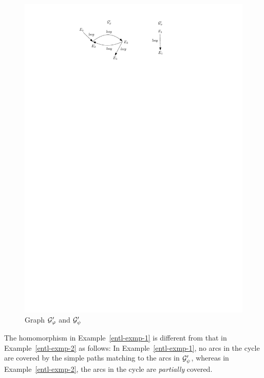 \documentclass{llncs}
\begin{document}
\begin{figure}[htbp]
\begin{center}
\includegraphics[scale=0.6]{entl-example-2.pdf}
\end{center}
\caption{Graph $\mathcal{G}'_\varphi$ and $\mathcal{G}'_\psi$}\label{fig-entl-example-2}
\end{figure}

The homomorphism in Example~\ref{entl-exmp-1} is different from that in Example~\ref{entl-exmp-2} as follows: In Example~\ref{entl-exmp-1}, no arcs in the cycle are covered by the simple paths matching to the arcs in $\mathcal{G}'_\psi$, whereas in Example~\ref{entl-exmp-2}, the arcs in the cycle are \emph{partially} covered.
\end{document}
